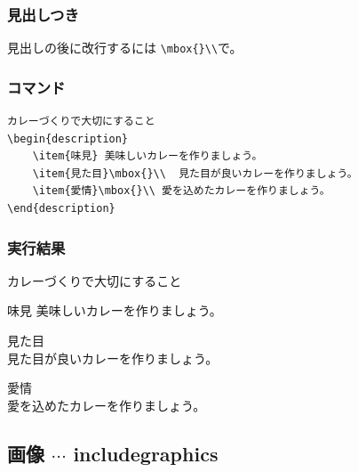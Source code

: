 \documentclass[a4j, titlepage]{jarticle}
\begin{document}
\subsubsection{見出しつき}
見出しの後に改行するには \verb|\mbox{}\\|で。
\begin{multicols}{2}

\subsubsection*{コマンド}
\begin{lstlisting}
カレーづくりで大切にすること
\begin{description}
    \item{味見} 美味しいカレーを作りましょう。
    \item{見た目}\mbox{}\\  見た目が良いカレーを作りましょう。
    \item{愛情}\mbox{}\\ 愛を込めたカレーを作りましょう。
\end{description}
\end{lstlisting}

\vfill\null
\columnbreak

\subsubsection*{実行結果}
\begin{screen}

カレーづくりで大切にすること
\begin{description}
    \item{味見} 美味しいカレーを作りましょう。
    \item{見た目}\mbox{}\\  見た目が良いカレーを作りましょう。
    \item{愛情}\mbox{}\\ 愛を込めたカレーを作りましょう。
\end{description}

\end{screen}
\end{multicols}


\subsection{画像 $\cdots$ includegraphics}
\end{document}
